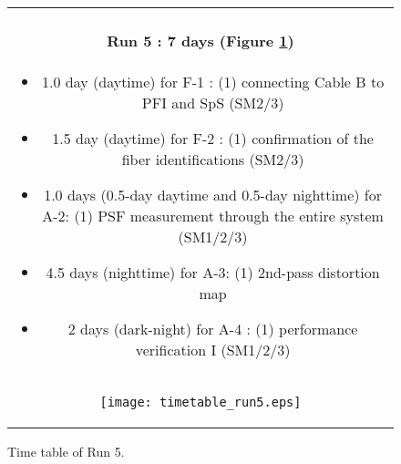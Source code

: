 \begin{figure}[!ht]
\begin{center}
\begin{tabular}{c}
\begin{minipage}{0.95\hsize}
\paragraph{Run 5 : 7 days  (Figure \ref{fig:run5})}
	\begin{itemize}
	\item 1.0 day (daytime) for F-1 :  
	(1) connecting Cable B to PFI and SpS (SM2/3)
	\item 1.5 day (daytime) for F-2 :  
	(1) confirmation of  the fiber identifications (SM2/3)
	\item 1.0 days (0.5-day daytime and 0.5-day nighttime) for A-2: 
	(1) PSF measurement through the entire system (SM1/2/3)
	\item 4.5 days (nighttime) for A-3: 
	(1) 2nd-pass distortion map
	\item 2 days (dark-night) for A-4 :
	(1) performance verification I (SM1/2/3)
	\end{itemize}
\end{minipage} \\
\begin{minipage}{0.8\hsize}
	\begin{center}
	\vspace*{5mm}
	\texttt{[image: timetable\_run5.eps]}
	\end{center}
	\vspace*{-5mm}
	\caption{Time table of Run 5.}
	\label{fig:run5}
\end{minipage}
\end{tabular}
\end{center}
\end{figure}

